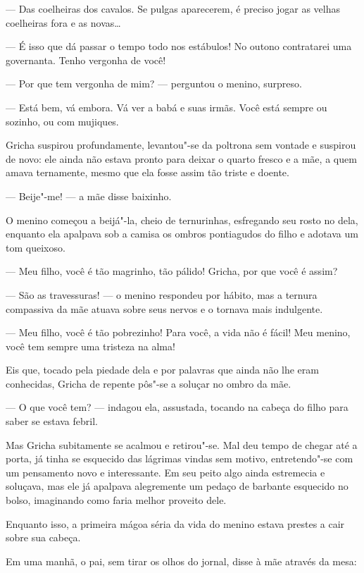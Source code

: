 --- Das coelheiras dos cavalos. Se pulgas aparecerem, é preciso jogar as
velhas coelheiras fora e as novas\ldots{}

--- É isso que dá passar o tempo todo nos estábulos! No outono
contratarei uma governanta. Tenho vergonha de você!

--- Por que tem vergonha de mim? --- perguntou o menino, surpreso.

--- Está bem, vá embora. Vá ver a babá e suas irmãs. Você está sempre ou
sozinho, ou com mujiques.

Gricha suspirou profundamente, levantou"-se da poltrona sem vontade e
suspirou de novo: ele ainda não estava pronto para deixar o quarto
fresco e a mãe, a quem amava ternamente, mesmo que ela fosse assim tão
triste e doente.

--- Beije"-me! --- a mãe disse baixinho.

O menino começou a beijá"-la, cheio de ternurinhas, esfregando seu rosto
no dela, enquanto ela apalpava sob a camisa os ombros pontiagudos do
filho e adotava um tom queixoso.

--- Meu filho, você é tão magrinho, tão pálido! Gricha, por que você é
assim?

--- São as travessuras! --- o menino respondeu por hábito, mas a ternura
compassiva da mãe atuava sobre seus nervos e o tornava mais indulgente.

--- Meu filho, você é tão pobrezinho! Para você, a vida não é fácil! Meu
menino, você tem sempre uma tristeza na alma!

Eis que, tocado pela piedade dela e por palavras que ainda não lhe eram
conhecidas, Gricha de repente pôs"-se a soluçar no ombro da mãe.

--- O que você tem? --- indagou ela, assustada, tocando na cabeça do
filho para saber se estava febril.

Mas Gricha subitamente se acalmou e retirou"-se. Mal deu tempo de chegar
até a porta, já tinha se esquecido das lágrimas vindas sem motivo,
entretendo"-se com um pensamento novo e interessante. Em seu peito algo
ainda estremecia e soluçava, mas ele já apalpava alegremente um pedaço
de barbante esquecido no bolso, imaginando como faria melhor proveito
dele.

\asterisc

Enquanto isso, a primeira mágoa séria da vida do menino estava prestes a
cair sobre sua cabeça.

Em uma manhã, o pai, sem tirar os olhos do jornal, disse à mãe através
da mesa:

